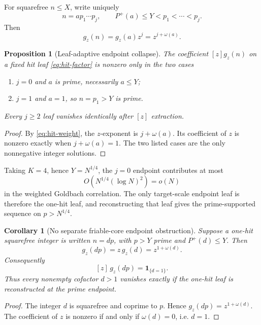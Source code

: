 \documentclass[11pt]{article}
\newtheorem{proposition}[theorem]{Proposition}
\newtheorem{corollary}[theorem]{Corollary}
\theoremstyle{definition}
\theoremstyle{remark}
\newcommand{\1}{\mathbf 1}
\begin{document}
For squarefree \(n\le X\), write uniquely
\begin{equation}\label{eq:hit-factor}
 n=a p_1\cdots p_j,
 \qquad
 P^+(a)\le Y<p_1<\cdots<p_j.
\end{equation}
Then
\begin{equation}\label{eq:hit-weight}
 g_z(n)=g_z(a)z^j=z^{j+\omega(a)}.
\end{equation}

\begin{proposition}[Leaf-adaptive endpoint collapse]\label{prop:endpoint-collapse}
The coefficient \([z]g_z(n)\) on a fixed hit leaf \eqref{eq:hit-factor} is nonzero only in the two cases
\begin{enumerate}[label=\textup{(\roman*)}]
\item \(j=0\) and \(a\) is prime, necessarily \(a\le Y\);
\item \(j=1\) and \(a=1\), so \(n=p_1>Y\) is prime.
\end{enumerate}
Every \(j\ge2\) leaf vanishes identically after \([z]\) extraction.
\end{proposition}

\begin{proof}
By \eqref{eq:hit-weight}, the \(z\)-exponent is \(j+\omega(a)\).  Its coefficient of \(z\) is nonzero exactly when \(j+\omega(a)=1\).  The two listed cases are the only nonnegative integer solutions.
\end{proof}

Taking \(K=4\), hence \(Y=N^{1/4}\), the \(j=0\) endpoint contributes at most
\begin{equation}\label{eq:j0small}
 O\!\left(N^{1/4}(\log N)^2\right)=o(N)
\end{equation}
in the weighted Goldbach correlation.  The only target-scale endpoint leaf is therefore the one-hit leaf, and reconstructing that leaf gives the prime-supported sequence on \(p>N^{1/4}\).

\begin{corollary}[No separate friable-core endpoint obstruction]\label{cor:fc-collapse}
Suppose a one-hit squarefree integer is written \(n=dp\), with \(p>Y\) prime and \(P^+(d)\le Y\).  Then
\[
 g_z(dp)=z\,g_z(d)=z^{1+\omega(d)}.
\]
Consequently
\[
 [z]\,g_z(dp)=\1_{\{d=1\}}.
\]
Thus every nonempty cofactor \(d>1\) vanishes \emph{exactly} if the one-hit leaf is reconstructed at the prime endpoint.
\end{corollary}

\begin{proof}
The integer \(d\) is squarefree and coprime to \(p\).  Hence \(g_z(dp)=z^{1+\omega(d)}\).  The coefficient of \(z\) is nonzero if and only if \(\omega(d)=0\), i.e. \(d=1\).
\end{proof}
\end{document}
